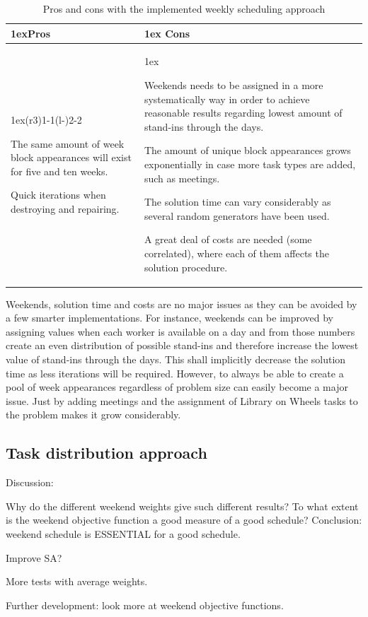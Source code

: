 \begin{table}[!h]
\caption{Pros and cons with the implemented weekly scheduling approach}
\label{pros_cons_weekly_scheduling}
\begin{tabularx}{\linewidth}{>{\parskip1ex}X@{\kern4\tabcolsep}>{\parskip1ex}X}
\toprule
\hfil\bfseries Pros
&
\hfil\bfseries Cons
\\\cmidrule(r{3\tabcolsep}){1-1}\cmidrule(l{-\tabcolsep}){2-2}

The same amount of week block appearances will exist for five and ten weeks.\par
Quick iterations when destroying and repairing.\par

&

Weekends needs to be assigned in a more systematically way in order to achieve reasonable results regarding lowest amount of stand-ins through the days.\par
The amount of unique block appearances grows exponentially in case more task types are added, such as meetings.\par
The solution time can vary considerably as several random generators have been used.\par
A great deal of costs are needed (some correlated), where each of them affects the solution procedure.

\\\bottomrule
\end{tabularx}
\end{table}

 Weekends, solution time and costs are no major issues as they can be avoided by a few smarter implementations. For instance, weekends can be improved by assigning values when each worker is available on a day and from those numbers create an even distribution of possible stand-ins and therefore increase the lowest value of stand-ins through the days. This shall implicitly decrease the solution time as less iterations will be required. However, to always be able to create a pool of week appearances regardless of problem size can easily become a major issue. Just by adding meetings and the assignment of Library on Wheels tasks to the problem makes it grow considerably.
 

\subsection{Task distribution approach}
Discussion: 

Why do the different weekend weights give such different results?
To what extent is the weekend objective function a good measure of a good schedule?
Conclusion: weekend schedule is ESSENTIAL for a good schedule.

Improve SA?

More tests with average weights.

Further development: look more at weekend objective functions.
